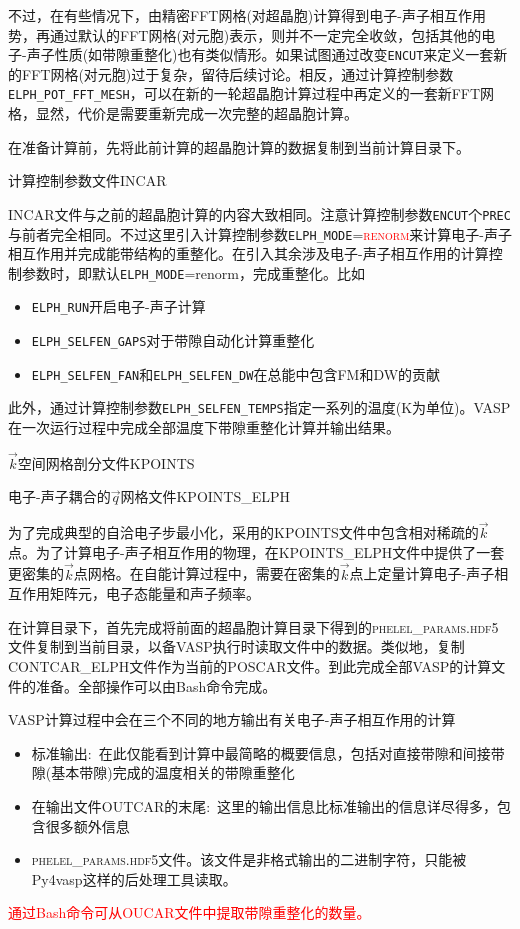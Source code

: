不过，在有些情况下，由精密\textrm{FFT}网格(对超晶胞)计算得到电子-声子相互作用势，再通过默认的\textrm{FFT}网格(对元胞)表示，则并不一定完全收敛，包括其他的电子-声子性质(如带隙重整化)也有类似情形。如果试图通过改变\texttt{ENCUT}来定义一套新的\textrm{FFT}网格(对元胞)过于复杂，留待后续讨论。相反，通过计算控制参数\texttt{ELPH\_POT\_FFT\_MESH}，可以在新的一轮超晶胞计算过程中再定义的一套新\textrm{FFT}网格，显然，代价是需要重新完成一次完整的超晶胞计算。

在准备计算前，先将此前计算的超晶胞计算的数据复制到当前计算目录下。

计算控制参数文件\textrm{INCAR}

\textrm{INCAR}文件与之前的超晶胞计算的内容大致相同。注意计算控制参数\texttt{ENCUT}个\texttt{PREC}与前者完全相同。不过这里引入计算控制参数\texttt{ELPH\_MODE}=\textcolor{red}{\textsc{renorm}}来计算电子-声子相互作用并完成能带结构的重整化。在引入其余涉及电子-声子相互作用的计算控制参数时，即默认\texttt{ELPH\_MODE}=\textrm{renorm}，完成重整化。比如
\begin{itemize}
	\item \texttt{ELPH\_RUN}开启电子-声子计算
	\item \texttt{ELPH\_SELFEN\_GAPS}对于带隙自动化计算重整化
	\item \texttt{ELPH\_SELFEN\_FAN}和\texttt{ELPH\_SELFEN\_DW}在总能中包含\textrm{FM}和\textrm{DW}的贡献
\end{itemize}
此外，通过计算控制参数\texttt{ELPH\_SELFEN\_TEMPS}指定一系列的温度(\textrm{K}为单位)。\textrm{VASP}在一次运行过程中完成全部温度下带隙重整化计算并输出结果。

$\vec k$空间网格剖分文件\textrm{KPOINTS}

电子-声子耦合的$\vec q$网格文件\textrm{KPOINTS\_ELPH}

为了完成典型的自洽电子步最小化，采用的\textrm{KPOINTS}文件中包含相对稀疏的$\vec k$点。为了计算电子-声子相互作用的物理，在\textrm{KPOINTS\_ELPH}文件中提供了一套更密集的$\vec k$点网格。在自能计算过程中，需要在密集的$\vec k$点上定量计算电子-声子相互作用矩阵元，电子态能量和声子频率。

在计算目录下，首先完成将前面的超晶胞计算目录下得到的\textsc{phelel\_params.hdf5}文件复制到当前目录，以备\textrm{VASP}执行时读取文件中的数据。类似地，复制\textrm{CONTCAR\_ELPH}文件作为当前的\textrm{POSCAR}文件。到此完成全部\textrm{VASP}的计算文件的准备。全部操作可以由\textrm{Bash}命令完成。

\textrm{VASP}计算过程中会在三个不同的地方输出有关电子-声子相互作用的计算
\begin{itemize}
	\item 标准输出:~在此仅能看到计算中最简略的概要信息，包括对直接带隙和间接带隙(基本带隙)完成的温度相关的带隙重整化
	\item 在输出文件\textrm{OUTCAR}的末尾:~这里的输出信息比标准输出的信息详尽得多，包含很多额外信息
	\item \textsc{phelel\_params.hdf5}文件。该文件是非格式输出的二进制字符，只能被\textrm{Py4vasp}这样的后处理工具读取。
\end{itemize}
\textcolor{red}{通过\textrm{Bash}命令可从\textrm{OUCAR}文件中提取带隙重整化的数量。}

